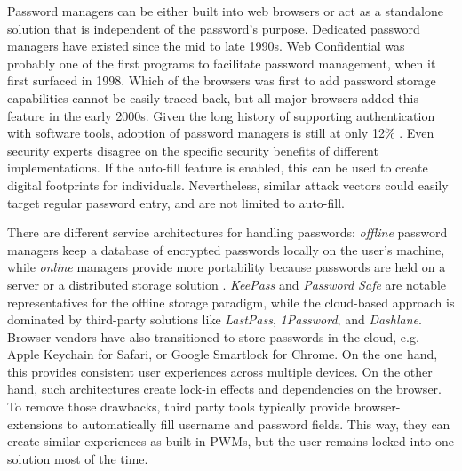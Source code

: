 Password managers can be either built into web browsers or act as a standalone solution that is independent of the password's purpose. Dedicated password managers have existed since the mid to late 1990s. Web Confidential was probably one of the first programs to facilitate password management, when it first surfaced in 1998. Which of the browsers was first to add password storage capabilities cannot be easily traced back, but all major browsers added this feature in the early 2000s. Given the long history of supporting authentication with software tools, adoption of password managers is still at only 12\% \cite{Olmstead2017AmerciansCybersecurity}. Even security experts disagree on the specific security benefits of different implementations. If the auto-fill feature is enabled, this can be used to create digital footprints for individuals. Nevertheless, similar attack vectors could easily target regular password entry, and are not limited to auto-fill. 

There are different service architectures for handling passwords: \textit{offline} password managers keep a database of encrypted passwords locally on the user's machine, while \textit{online} managers provide more portability because passwords are held on a server or a distributed storage solution \cite{McCarney2012Tapas}. \textit{KeePass} and \textit{Password Safe} are notable representatives for the offline storage paradigm, while the cloud-based approach is dominated by third-party solutions like \textit{LastPass}, \textit{1Password}, and \textit{Dashlane}. Browser vendors have also transitioned to store passwords in the cloud, e.g. Apple Keychain for Safari, or Google Smartlock for Chrome. On the one hand, this provides consistent user experiences across multiple devices. On the other hand, such architectures create lock-in effects and dependencies on the browser. To remove those drawbacks, third party tools typically provide browser-extensions to automatically fill username and password fields. This way, they can create similar experiences as built-in PWMs, but the user remains locked into one solution most of the time.  

